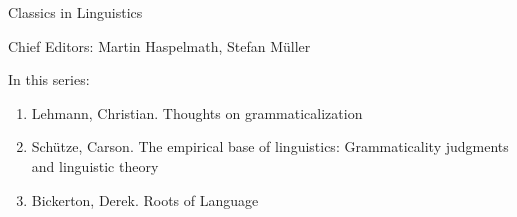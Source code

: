 {\large Classics in Linguistics}

\bigskip

Chief Editors: Martin Haspelmath, Stefan Müller

\bigskip

In this series:

\begin{enumerate}
\item Lehmann, Christian. Thoughts on grammaticalization
\item Schütze, Carson. The empirical base of linguistics: Grammaticality judgments and linguistic theory
\item Bickerton, Derek. Roots of Language
\end{enumerate}


\vfill

